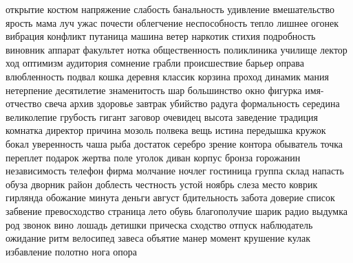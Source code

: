 открытие \newpage
костюм \newpage
напряжение \newpage
слабость \newpage
банальность \newpage
удивление \newpage
вмешательство \newpage
ярость \newpage
мама \newpage
луч \newpage
ужас \newpage
почести \newpage
облегчение \newpage
неспособность \newpage
тепло \newpage
лишнее \newpage
огонек \newpage
вибрация \newpage
конфликт \newpage
путаница \newpage
машина \newpage
ветер \newpage
наркотик \newpage
стихия \newpage
подробность \newpage
виновник \newpage
аппарат \newpage
факультет \newpage
нотка \newpage
общественность \newpage
поликлиника \newpage
училище \newpage
лектор \newpage
ход \newpage
оптимизм \newpage
аудитория \newpage
сомнение \newpage
грабли \newpage
происшествие \newpage
барьер \newpage
оправа \newpage
влюбленность \newpage
подвал \newpage
кошка \newpage
деревня \newpage
классик \newpage
корзина \newpage
проход \newpage
динамик \newpage
мания \newpage
нетерпение \newpage
десятилетие \newpage
знаменитость \newpage
шар \newpage
большинство \newpage
окно \newpage
фигурка \newpage
имя-отчество \newpage
свеча \newpage
архив \newpage
здоровье \newpage
завтрак \newpage
убийство \newpage
радуга \newpage
формальность \newpage
середина \newpage
великолепие \newpage
грубость \newpage
гигант \newpage
заговор \newpage
очевидец \newpage
высота \newpage
заведение \newpage
традиция \newpage
комнатка \newpage
директор \newpage
причина \newpage
мозоль \newpage
полвека \newpage
вещь \newpage
истина \newpage
передышка \newpage
кружок \newpage
бокал \newpage
уверенность \newpage
чаша \newpage
рыба \newpage
достаток \newpage
серебро \newpage
зрение \newpage
контора \newpage
обыватель \newpage
точка \newpage
переплет \newpage
подарок \newpage
жертва \newpage
поле \newpage
уголок \newpage
диван \newpage
корпус \newpage
бронза \newpage
горожанин \newpage
независимость \newpage
телефон \newpage
фирма \newpage
молчание \newpage
ночлег \newpage
гостиница \newpage
группа \newpage
склад \newpage
напасть \newpage
обуза \newpage
дворник \newpage
район \newpage
доблесть \newpage
честность \newpage
устой \newpage
ноябрь \newpage
слеза \newpage
место \newpage
коврик \newpage
гирлянда \newpage
обожание \newpage
минута \newpage
деньги \newpage
август \newpage
бдительность \newpage
забота \newpage
доверие \newpage
список \newpage
забвение \newpage
превосходство \newpage
страница \newpage
лето \newpage
обувь \newpage
благополучие \newpage
шарик \newpage
радио \newpage
выдумка \newpage
род \newpage
звонок \newpage
вино \newpage
лошадь \newpage
детишки \newpage
прическа \newpage
сходство \newpage
отпуск \newpage
наблюдатель \newpage
ожидание \newpage
ритм \newpage
велосипед \newpage
завеса \newpage
объятие \newpage
манер \newpage
момент \newpage
крушение \newpage
кулак \newpage
избавление \newpage
полотно \newpage
нога \newpage
опора \newpage